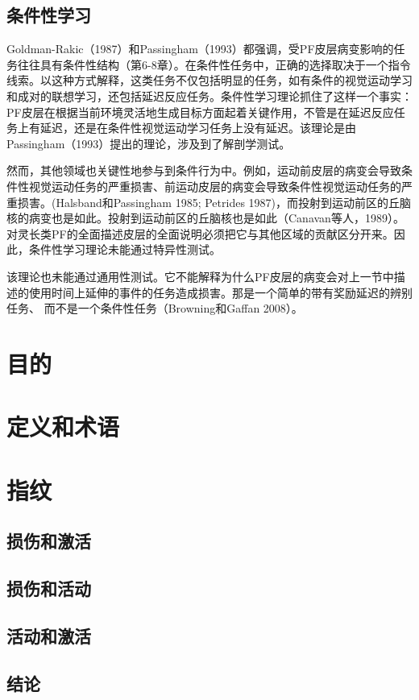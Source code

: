 \subsection{条件性学习}
Goldman-Rakic（1987）和Passingham（1993）都强调，受PF皮层病变影响的任务往往具有条件性结构（第6-8章）。在条件性任务中，正确的选择取决于一个指令线索。以这种方式解释，这类任务不仅包括明显的任务，如有条件的视觉运动学习和成对的联想学习，还包括延迟反应任务。条件性学习理论抓住了这样一个事实：PF皮层在根据当前环境灵活地生成目标方面起着关键作用，不管是在延迟反应任务上有延迟，还是在条件性视觉运动学习任务上没有延迟。该理论是由 Passingham（1993）提出的理论，涉及到了解剖学测试。
\par 
然而，其他领域也关键性地参与到条件行为中。例如，运动前皮层的病变会导致条件性视觉运动任务的严重损害、前运动皮层的病变会导致条件性视觉运动任务的严重损害。(Halsband和Passingham 1985; Petrides 1987)，而投射到运动前区的丘脑核的病变也是如此。投射到运动前区的丘脑核也是如此（Canavan等人，1989）。对灵长类PF的全面描述皮层的全面说明必须把它与其他区域的贡献区分开来。因此，条件性学习理论未能通过特异性测试。
\par 
该理论也未能通过通用性测试。它不能解释为什么PF皮层的病变会对上一节中描述的使用时间上延伸的事件的任务造成损害。那是一个简单的带有奖励延迟的辨别任务、 而不是一个条件性任务（Browning和Gaffan 2008）。

\section{目的}

\section{定义和术语}


\section{指纹}

\subsection{损伤和激活}

\subsection{损伤和活动}

\subsection{活动和激活}




\subsection{结论}


